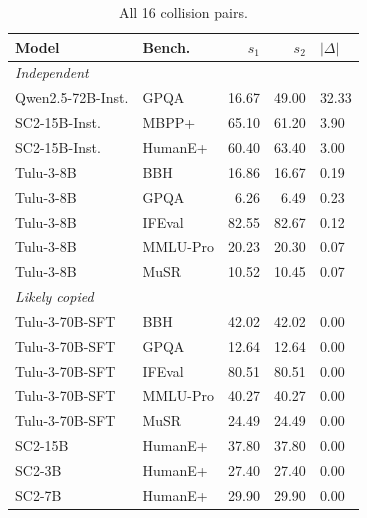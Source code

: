 \documentclass[11pt]{article}
\begin{document}
\begin{table}[h]
\centering
\footnotesize
\caption{All 16 collision pairs.}
\label{tab:collisions}
\begin{tabular}{llrrl}
\toprule
\textbf{Model} & \textbf{Bench.} & $s_1$ & $s_2$ & $|\Delta|$ \\
\midrule
\multicolumn{5}{l}{\emph{Independent}} \\
Qwen2.5-72B-Inst. & GPQA    & 16.67 & 49.00 & 32.33 \\
SC2-15B-Inst.     & MBPP+   & 65.10 & 61.20 &  3.90 \\
SC2-15B-Inst.     & HumanE+ & 60.40 & 63.40 &  3.00 \\
Tulu-3-8B         & BBH     & 16.86 & 16.67 &  0.19 \\
Tulu-3-8B         & GPQA    &  6.26 &  6.49 &  0.23 \\
Tulu-3-8B         & IFEval  & 82.55 & 82.67 &  0.12 \\
Tulu-3-8B         & MMLU-Pro& 20.23 & 20.30 &  0.07 \\
Tulu-3-8B         & MuSR   & 10.52 & 10.45 &  0.07 \\
\midrule
\multicolumn{5}{l}{\emph{Likely copied}} \\
Tulu-3-70B-SFT & BBH      & 42.02 & 42.02 & 0.00 \\
Tulu-3-70B-SFT & GPQA     & 12.64 & 12.64 & 0.00 \\
Tulu-3-70B-SFT & IFEval   & 80.51 & 80.51 & 0.00 \\
Tulu-3-70B-SFT & MMLU-Pro & 40.27 & 40.27 & 0.00 \\
Tulu-3-70B-SFT & MuSR     & 24.49 & 24.49 & 0.00 \\
SC2-15B        & HumanE+  & 37.80 & 37.80 & 0.00 \\
SC2-3B         & HumanE+  & 27.40 & 27.40 & 0.00 \\
SC2-7B         & HumanE+  & 29.90 & 29.90 & 0.00 \\
\bottomrule
\end{tabular}
\end{table}
\end{document}
